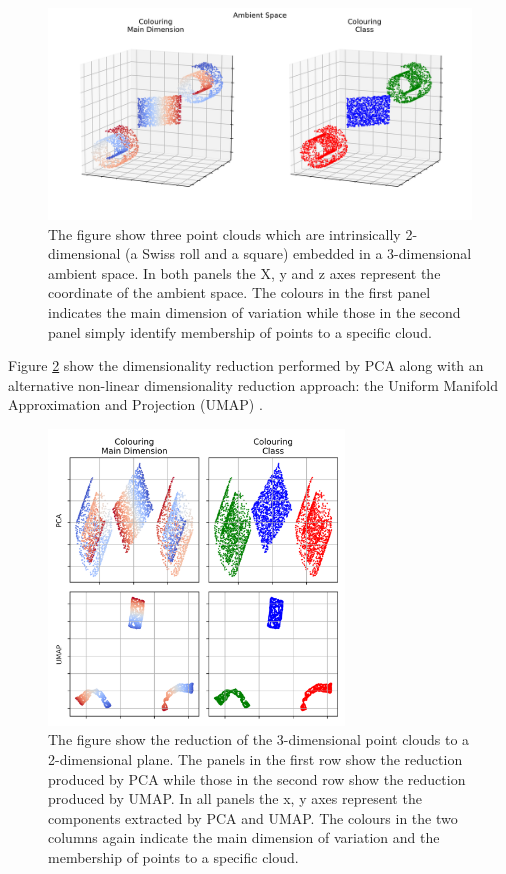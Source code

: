 \begin{figure}[h]
  \centering
  \includegraphics[width=\textwidth]{images/chapter_4/ambient.png}
    \caption[\textbf{Swiss rolls and square in ambient space}]{The figure show three point clouds which are intrinsically 2-dimensional (a Swiss roll and a square) embedded in a 3-dimensional ambient space. In both panels the X, y and z axes represent the coordinate of the ambient space. The colours in the first panel indicates the main dimension of variation while those in the second panel simply identify membership of points to a specific cloud.}
    \label{fig: swiss_ambient}
\end{figure}

Figure \ref{fig: swiss_reduce} show the dimensionality reduction performed by PCA along with an alternative non-linear dimensionality reduction approach: the Uniform Manifold Approximation and Projection (UMAP) \cite{2018arXivUMAP}. 
\label{dim_reduction}
\begin{figure}[h]
  \centering
  \includegraphics[width=0.7\textwidth]{images/chapter_4/reduced.png}
    \caption[\textbf{PCA and UMAP reduction of Swiss roll and square}]{The figure show the reduction of the 3-dimensional point clouds to a 2-dimensional plane. The panels in the first row show the reduction produced by PCA while those in the second row show the reduction produced by UMAP. In all panels the x, y axes represent the components extracted by PCA and UMAP. The colours in the two columns again indicate the main dimension of variation and the membership of points to a specific cloud.}
    \label{fig: swiss_reduce}
\end{figure}

